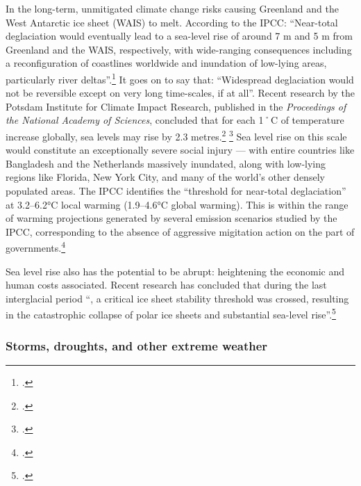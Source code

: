 In the long-term, unmitigated climate change risks causing Greenland and the West Antarctic ice sheet (WAIS) to melt.
According to the IPCC: ``Near-total deglaciation would eventually lead to a sea-level rise of around 7 m and 5 m from Greenland and the WAIS, respectively, with wide-ranging consequences including a reconfiguration of coastlines worldwide and inundation of low-lying areas, particularly river deltas''.\footcite[][See: "Deglaciation of West Antarctic and Greenland ice sheets" \url{https://www.ipcc.ch/publications_and_data/ar4/wg2/en/ch19s19-3-5-2.html}]{IPCC2007}
It goes on to say that: ``Widespread deglaciation would not be reversible except on very long time-scales, if at all''.
Recent research by the Potsdam Institute for Climate Impact Research, published in the \emph{Proceedings of the National Academy of Sciences}, concluded that for each 1˚C of temperature increase globally, sea levels may rise by 2.3 metres.\footcite[][]{PotsdamSeaLevelReport} \footcite[See also: ][]{TwoPointThreeMetres}
Sea level rise on this scale would constitute an exceptionally severe social injury --- with entire countries like Bangladesh and the Netherlands massively inundated, along with low-lying regions like Florida, New York City, and many of the world's other densely populated areas.
The IPCC identifies the ``threshold for near-total deglaciation'' at 3.2--6.2°C local warming (1.9--4.6°C global warming).
This is within the range of warming projections generated by several emission scenarios studied by the IPCC, corresponding to the absence of aggressive migitation action on the part of governments.\footcite[][See: "Projected climate change an its impacts" \url{https://www.ipcc.ch/publications_and_data/ar4/syr/en/spms3.html}"]{IPCC2007}



Sea level rise also has the potential to be abrupt: heightening the economic and human costs associated.
Recent research has concluded that during the last interglacial period ``, a critical ice sheet stability threshold was crossed, resulting in the catastrophic collapse of polar ice sheets and substantial sea-level rise''.\footcite[][p. 1]{OLeary2013}


	
	\subsubsection{Storms, droughts, and other extreme weather}



